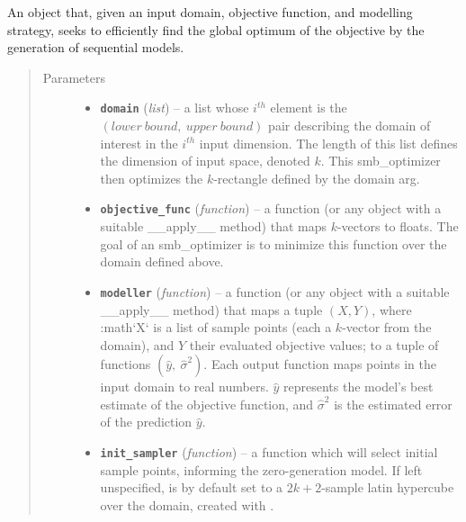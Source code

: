 \documentclass[letterpaper,10pt,english]{sphinxmanual}
\begin{document}
\begin{fulllineitems}
\label{index:smbo.smb_optimizer.smb_optimizer}
An object that, given an input domain, objective function, and modelling strategy, seeks to efficiently find
the global optimum of the objective by the generation of sequential models.
\begin{quote}\begin{description}
\item[{Parameters}] \leavevmode\begin{itemize}
\item {} 
\textbf{\texttt{domain}} (\emph{list}) -- a list whose \(i^{th}\) element is the \((lower\ bound,\ upper\ bound)\) pair
describing the domain of interest in the \(i^{th}\) input dimension. The length
of this list defines the dimension of input space, denoted \(k\). This smb\_optimizer
then optimizes the \(k\)-rectangle defined by the domain arg.

\item {} 
\textbf{\texttt{objective\_func}} (\emph{function}) -- a function (or any object with a suitable \_\_apply\_\_ method)
that maps \(k\)-vectors to floats. The goal of an smb\_optimizer is to minimize this
function over the domain defined above.

\item {} 
\textbf{\texttt{modeller}} (\emph{function}) -- a function (or any object with a suitable \_\_apply\_\_ method) that maps a
tuple \((X,Y)\), where :math{}`X{}` is a list of sample points (each a \(k\)-vector from the domain),
and \(Y\) their evaluated objective values; to a tuple of functions
\((\hat{y},\ \hat{\sigma}^2)\). Each output function maps points in the input domain to real numbers.
\(\hat{y}\) represents the model's best estimate of the objective function, and \(\hat{\sigma}^2\)
is the estimated error of the prediction \(\hat{y}\).

\item {} 
\textbf{\texttt{init\_sampler}} (\emph{function}) -- a function which will select initial sample points, informing the zero-generation model.
If left unspecified, is by default set to a \(2k+2\)-sample latin hypercube over the domain,
created with .

\end{itemize}


\end{description}
\end{quote}
\end{fulllineitems}
\end{document}
